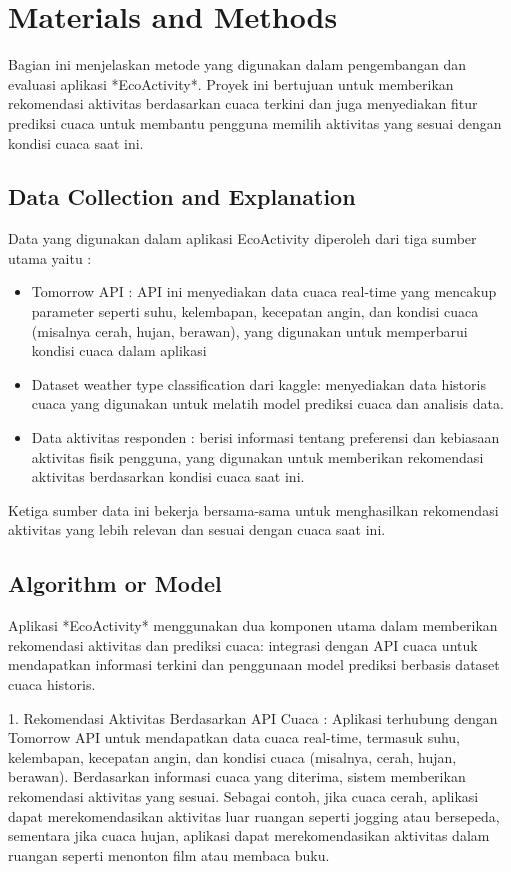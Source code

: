 \documentclass[journal,article,submit,pdftex,moreauthors]{Definitions/mdpi}
\begin{document}
\section{Materials and Methods}

Bagian ini menjelaskan metode yang digunakan dalam pengembangan dan evaluasi aplikasi *EcoActivity*. Proyek ini bertujuan untuk memberikan rekomendasi aktivitas berdasarkan cuaca terkini dan juga menyediakan fitur prediksi cuaca untuk membantu pengguna memilih aktivitas yang sesuai dengan kondisi cuaca saat ini.

\subsection{Data Collection and Explanation}
Data yang digunakan dalam aplikasi EcoActivity diperoleh dari tiga sumber utama yaitu :
\begin{itemize}
    \item Tomorrow API : API ini menyediakan data cuaca real-time yang mencakup parameter seperti suhu, kelembapan, kecepatan angin, dan kondisi cuaca (misalnya cerah, hujan, berawan), yang digunakan untuk memperbarui kondisi cuaca dalam aplikasi
    \item Dataset weather type classification dari kaggle: menyediakan data historis cuaca yang digunakan untuk melatih model prediksi cuaca dan analisis data.
    \item Data aktivitas responden :  berisi informasi tentang preferensi dan kebiasaan aktivitas fisik pengguna, yang digunakan untuk memberikan rekomendasi aktivitas berdasarkan kondisi cuaca saat ini.
\end{itemize}
Ketiga sumber data ini bekerja bersama-sama untuk menghasilkan rekomendasi aktivitas yang lebih relevan dan sesuai dengan cuaca saat ini.

\subsection{Algorithm or Model}
Aplikasi *EcoActivity* menggunakan dua komponen utama dalam memberikan rekomendasi aktivitas dan prediksi cuaca: integrasi dengan API cuaca untuk mendapatkan informasi terkini dan penggunaan model prediksi berbasis dataset cuaca historis.

1. Rekomendasi Aktivitas Berdasarkan API Cuaca : 
   Aplikasi terhubung dengan Tomorrow API untuk mendapatkan data cuaca real-time, termasuk suhu, kelembapan, kecepatan angin, dan kondisi cuaca (misalnya, cerah, hujan, berawan). Berdasarkan informasi cuaca yang diterima, sistem memberikan rekomendasi aktivitas yang sesuai. Sebagai contoh, jika cuaca cerah, aplikasi dapat merekomendasikan aktivitas luar ruangan seperti jogging atau bersepeda, sementara jika cuaca hujan, aplikasi dapat merekomendasikan aktivitas dalam ruangan seperti menonton film atau membaca buku.
\end{document}
